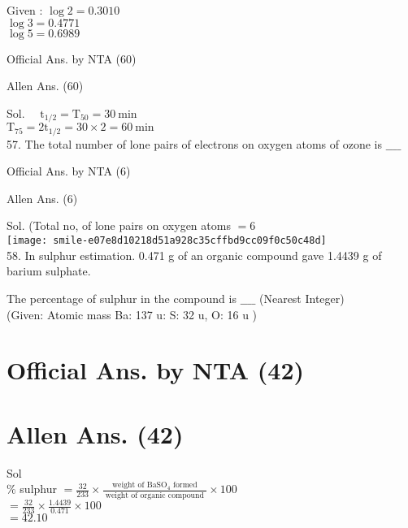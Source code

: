 \documentclass[10pt]{article}
\begin{document}
Given : \(\log 2=0.3010\)\\
\(\log 3=0.4771\)\\
\(\log 5=0.6989\)

Official Ans. by NTA (60)

Allen Ans. (60)

Sol. \(\quad \mathrm{t}_{1 / 2}=\mathrm{T}_{50}=30 \mathrm{~min}\)\\
\(\mathrm{T}_{75}=2 \mathrm{t}_{1 / 2}=30 \times 2=60 \mathrm{~min}\)\\
57. The total number of lone pairs of electrons on oxygen atoms of ozone is \(\_\_\_\_\)

Official Ans. by NTA (6)

Allen Ans. (6)

Sol. (Total no, of lone pairs on oxygen atoms \(=6\)\\
\texttt{[image: smile-e07e8d10218d51a928c35cffbd9cc09f0c50c48d]}\\
58. In sulphur estimation. 0.471 g of an organic compound gave 1.4439 g of barium sulphate.

The percentage of sulphur in the compound is \(\_\_\_\_\) (Nearest Integer)\\
(Given: Atomic mass Ba: 137 u: S: 32 u, O: 16 u )

\section*{Official Ans. by NTA (42)}
\section*{Allen Ans. (42)}
Sol\\
\(\%\) sulphur \(=\frac{32}{233} \times \frac{\text { weight of } \mathrm{BaSO}_{4} \text { formed }}{\text { weight of organic compound }} \times 100\)\\
\(=\frac{32}{233} \times \frac{1.4439}{0.471} \times 100\)\\
\(=42.10\)
\end{document}
